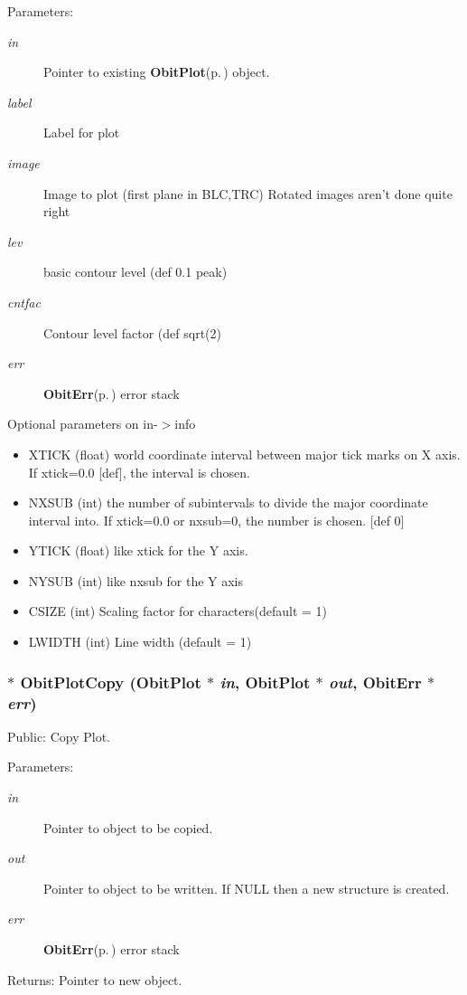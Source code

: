 \begin{Desc}
\item[Parameters:]
\begin{description}
\item[{\em in}]Pointer to existing {\bf Obit\-Plot}{\rm (p.\,\pageref{structObitPlot})} object. \item[{\em label}]Label for plot \item[{\em image}]Image to plot (first plane in BLC,TRC) Rotated images aren't done quite right \item[{\em lev}]basic contour level (def 0.1 peak) \item[{\em cntfac}]Contour level factor (def sqrt(2) \item[{\em err}]{\bf Obit\-Err}{\rm (p.\,\pageref{structObitErr})} error stack\end{description}
\end{Desc}
Optional parameters on in-$>$info \begin{itemize}
\item XTICK (float) world coordinate interval between major tick marks on X axis. If xtick=0.0 [def], the interval is chosen. \item NXSUB (int) the number of subintervals to divide the major coordinate interval into. If xtick=0.0 or nxsub=0, the number is chosen. [def 0] \item YTICK (float) like xtick for the Y axis. \item NYSUB (int) like nxsub for the Y axis \item CSIZE (int) Scaling factor for characters(default = 1) \item LWIDTH (int) Line width (default = 1) \end{itemize}
\subsubsection{$\ast$ Obit\-Plot\-Copy ({\bf Obit\-Plot} $\ast$ {\em in}, {\bf Obit\-Plot} $\ast$ {\em out}, {\bf Obit\-Err} $\ast$ {\em err})}\label{ObitPlot_8c_a9}


Public: Copy Plot. 

\begin{Desc}
\item[Parameters:]
\begin{description}
\item[{\em in}]Pointer to object to be copied. \item[{\em out}]Pointer to object to be written. If NULL then a new structure is created. \item[{\em err}]{\bf Obit\-Err}{\rm (p.\,\pageref{structObitErr})} error stack \end{description}
\end{Desc}
\begin{Desc}
\item[Returns:]Pointer to new object. \end{Desc}
